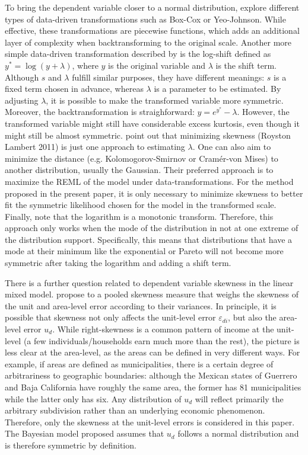 To bring the dependent variable closer to a normal distribution, \cite{rojas_perilla_data_2020} explore different types of data-driven transformations such as Box-Cox or Yeo-Johnson.
While effective, these transformations are piecewise functions, which adds an additional layer of complexity when backtransforming to the original scale.
Another more simple data-driven transformation described by \cite{rojas_perilla_data_2020} is the log-shift defined as $y^* = \log(y + \lambda)$, where $y$ is the original variable and $\lambda$ is the shift term. Although $s$ and $\lambda$ fulfill similar purposes, they have different meanings: $s$ is a fixed term chosen in advance, whereas $\lambda$ is a parameter to be estimated.
By adjusting $\lambda$, it is possible to make the transformed variable more symmetric.
Moreover, the backtransformation is straighforward: $y = e^{y^*} - \lambda$.
However, the transformed variable might still have considerable excess kurtosis, even though it might still be almost symmetric.
\cite{rojas_perilla_data_2020} point out that minimizing skewness (Royston Lambert 2011) is just one approach to estimating $\lambda$.
One can also aim to minimize the distance (e.g. Kolomogorov-Smirnov or Cramér-von Mises) to another distribution, usually the Gaussian.
Their preferred approach is to maximize the REML of the model under data-transformations.
For the method proposed in the present paper, it is only necessary to minimize skewness to better fit the symmetric likelihood chosen for the model in the transformed scale.
Finally, note that the logarithm is a monotonic transform.
Therefore, this approach only works when the mode of the distribution in not at one extreme of the distribution support.
Specifically, this means that distributions that have a mode at their minimum like the exponential or Pareto will not become more symmetric after taking the logarithm and adding a shift term.

There is a further question related to dependent variable skewness in the linear mixed model.
\cite{rojas_perilla_data_2020} propose to a pooled skewness measure that weighs the skewness of the unit and area-level error according to their variances.
In principle, it is possible that skewness not only affects the unit-level error $\varepsilon_{di}$, but also the area-level error $u_{d}$.
While right-skewness is a common pattern of income at the unit-level (a few individuals/households earn much more than the rest), the picture is less clear at the area-level, as the areas can be defined in very different ways.
For example, if areas are defined as municipalities, there is a certain degree of arbitrariness to geographic boundaries:
although the Mexican states of Guerrero and Baja California have roughly the same area, the former has 81 municipalities while the latter only has six.
Any distribution of $u_d$ will reflect primarily the arbitrary subdivision rather than an underlying economic phenomenon.
Therefore, only the skewness at the unit-level errors is considered in this paper.
The Bayesian model proposed assumes that $u_d$ follows a normal distribution and is therefore symmetric by definition.

